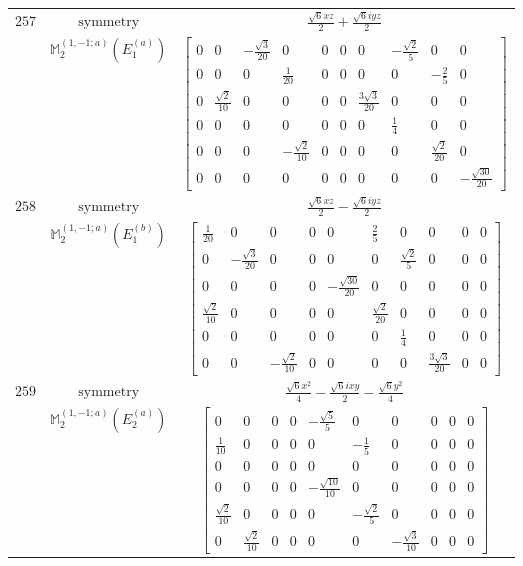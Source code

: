 \documentclass[fleqn,8pt,landscape]{jsarticle}
\begin{document}
\begin{longtable}{ccc}
$ 257 $ & $ \text{symmetry} $ & $ \frac{\sqrt{6} x z}{2} + \frac{\sqrt{6} i y z}{2} $ \\
$  $ & $ \mathbb{M}_{2}^{(1,-1;a)}(E_{1}^{(a)}) $ & $ \begin{bmatrix} 0 & 0 & - \frac{\sqrt{3}}{20} & 0 & 0 & 0 & 0 & - \frac{\sqrt{2}}{5} & 0 & 0 \\ 0 & 0 & 0 & \frac{1}{20} & 0 & 0 & 0 & 0 & - \frac{2}{5} & 0 \\ 0 & \frac{\sqrt{2}}{10} & 0 & 0 & 0 & 0 & \frac{3 \sqrt{3}}{20} & 0 & 0 & 0 \\ 0 & 0 & 0 & 0 & 0 & 0 & 0 & \frac{1}{4} & 0 & 0 \\ 0 & 0 & 0 & - \frac{\sqrt{2}}{10} & 0 & 0 & 0 & 0 & \frac{\sqrt{2}}{20} & 0 \\ 0 & 0 & 0 & 0 & 0 & 0 & 0 & 0 & 0 & - \frac{\sqrt{30}}{20} \end{bmatrix} $ \\ \hline
$ 258 $ & $ \text{symmetry} $ & $ \frac{\sqrt{6} x z}{2} - \frac{\sqrt{6} i y z}{2} $ \\
$  $ & $ \mathbb{M}_{2}^{(1,-1;a)}(E_{1}^{(b)}) $ & $ \begin{bmatrix} \frac{1}{20} & 0 & 0 & 0 & 0 & \frac{2}{5} & 0 & 0 & 0 & 0 \\ 0 & - \frac{\sqrt{3}}{20} & 0 & 0 & 0 & 0 & \frac{\sqrt{2}}{5} & 0 & 0 & 0 \\ 0 & 0 & 0 & 0 & - \frac{\sqrt{30}}{20} & 0 & 0 & 0 & 0 & 0 \\ \frac{\sqrt{2}}{10} & 0 & 0 & 0 & 0 & \frac{\sqrt{2}}{20} & 0 & 0 & 0 & 0 \\ 0 & 0 & 0 & 0 & 0 & 0 & \frac{1}{4} & 0 & 0 & 0 \\ 0 & 0 & - \frac{\sqrt{2}}{10} & 0 & 0 & 0 & 0 & \frac{3 \sqrt{3}}{20} & 0 & 0 \end{bmatrix} $ \\ \hline
$ 259 $ & $ \text{symmetry} $ & $ \frac{\sqrt{6} x^{2}}{4} - \frac{\sqrt{6} i x y}{2} - \frac{\sqrt{6} y^{2}}{4} $ \\
$  $ & $ \mathbb{M}_{2}^{(1,-1;a)}(E_{2}^{(a)}) $ & $ \begin{bmatrix} 0 & 0 & 0 & 0 & - \frac{\sqrt{5}}{5} & 0 & 0 & 0 & 0 & 0 \\ \frac{1}{10} & 0 & 0 & 0 & 0 & - \frac{1}{5} & 0 & 0 & 0 & 0 \\ 0 & 0 & 0 & 0 & 0 & 0 & 0 & 0 & 0 & 0 \\ 0 & 0 & 0 & 0 & - \frac{\sqrt{10}}{10} & 0 & 0 & 0 & 0 & 0 \\ \frac{\sqrt{2}}{10} & 0 & 0 & 0 & 0 & - \frac{\sqrt{2}}{5} & 0 & 0 & 0 & 0 \\ 0 & \frac{\sqrt{2}}{10} & 0 & 0 & 0 & 0 & - \frac{\sqrt{3}}{10} & 0 & 0 & 0 \end{bmatrix} $ \\ \hline

\end{longtable}
\end{document}
